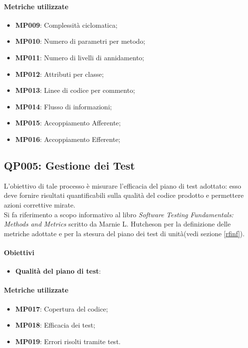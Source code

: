 \paragraph{Metriche utilizzate}

\begin{itemize}
	\item \textbf{MP009}: Complessità ciclomatica;
	\item \textbf{MP010}: Numero di parametri per metodo;
	\item \textbf{MP011}: Numero di livelli di annidamento;
	\item \textbf{MP012}: Attributi per classe;
	\item \textbf{MP013}: Linee di codice per commento;
	\item \textbf{MP014}: Flusso di informazioni;
	\item \textbf{MP015}: Accoppiamento Afferente;
	\item \textbf{MP016}: Accoppiamento Efferente;

	
\end{itemize}

\subsection{QP005: Gestione dei Test}\label{test}
L'obiettivo di tale processo è misurare l'efficacia del piano di test adottato: esso deve fornire risultati quantificabili sulla qualità del codice prodotto e permettere azioni correttive mirate.\\
Si fa riferimento a scopo informativo al libro \textit{Software Testing Fundamentals: Methods and Metrics} scritto da Marnie L. Hutcheson per la definizione delle metriche adottate e per la stesura del piano dei test di unità(vedi sezione \ref{rfinf}).
\paragraph{Obiettivi}
\begin{itemize}
	\item \textbf{Qualità del piano di test}: 
\end{itemize}
\paragraph{Metriche utilizzate}
\begin{itemize}
	\item \textbf{MP017}: Copertura del codice;
	\item \textbf{MP018}: Efficacia dei test;
	\item \textbf{MP019}: Errori risolti tramite test.
\end{itemize}

